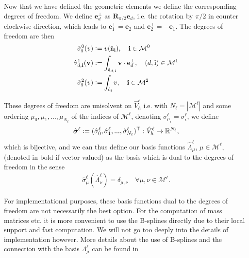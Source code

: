 \documentclass[../master_thesis.tex]{subfiles}
\begin{document}
Now that we have defined the geometric elements we define the corresponding 
degrees of freedom. 
We define $\mathbf{e}_d^\perp$ as $\mathbf{R}_{\pi/2}\mathbf{e}_d$, i.e. the rotation by $\pi /2$ in counter clockwise 
direction, which leads to $\mathbf{e}^\perp_1= \mathbf{e}_2$ and $\mathbf{e}^\perp_2= -\mathbf{e}_1$. 
The degrees of freedom are then
\begin{align*}
    \hat{\sigma}_\mathbf{i}^0(v)  &\vcentcolon= v(\hat{\mathtt{n}}_\mathbf{i}), \quad \mathbf{i} \in \mathcal{M}^0
    \\ \hat{\sigma}^1_{d,\mathbf{i}}(\mathbf{v})  
        &\vcentcolon= \int_{\hat{\mathtt{e}}_{d,\mathbf{i}}} \mathbf{v} \cdot \mathbf{e}^\perp_d 
        , \quad (d, \mathbf{i}) \in \mathcal{M}^1
    \\ \hat{\sigma}_{\mathbf{i}}^2(v) 
        &\vcentcolon= \int_{\hat{c}_{\mathbf{i}}} v 
        , \quad \mathbf{i} \in \mathcal{M}^2
\end{align*}

These degrees of freedom are unisolvent on $\hat{V}^\ell_h$ i.e. with $N_\ell = |\mathcal{M}^\ell|$ 
and some ordering $\mu_0, \mu_1, ..., \mu_{N_\ell}$ 
of the indices of $\mathcal{M}^\ell$, denoting $\sigma^\ell_{\mu_i} = \sigma_i^\ell$,  we
define 
\begin{align*}
    \hat{\bm{\sigma}}^\ell \vcentcolon= (\hat{\sigma}^\ell_0, \hat{\sigma}^\ell_1, ..., 
        \hat{\sigma}^\ell_{N_\ell})^\top
    : \hat{V}^\ell_h \rightarrow \mathbb{R}^{N_\ell},
\end{align*}
which is bijective, and we can thus define our basis functions 
$\hat{\Lambda}^\ell_\mu$, $\mu \in \mathcal{M}^\ell$, (denoted in bold if vector valued) 
as the basis which is dual to the 
degrees of freedom in the sense 
\begin{align*}
    \hat{\sigma}_\mu^\ell(\hat{\Lambda}^\ell_\nu) = \delta_{\mu,\nu} \quad \forall \mu, \nu \in \mathcal{M}^\ell.
\end{align*}

\begin{remark}
    For implementational purposes, these basis functions dual to the degrees of freedom are not necessarily the 
    best option. For the computation of mass matrices etc. 
    it is more convenient to use the B-splines directly due to their 
    local support and fast computation.
    We will not 
    go too deeply into the details of implementation however. More details about the 
    use of B-splines and the connection with the basis $\Lambda^\ell_\mu$ can be found 
    in \cite[Sec.\,4.8]{multipatch_paper} 
\end{remark}
\end{document}
